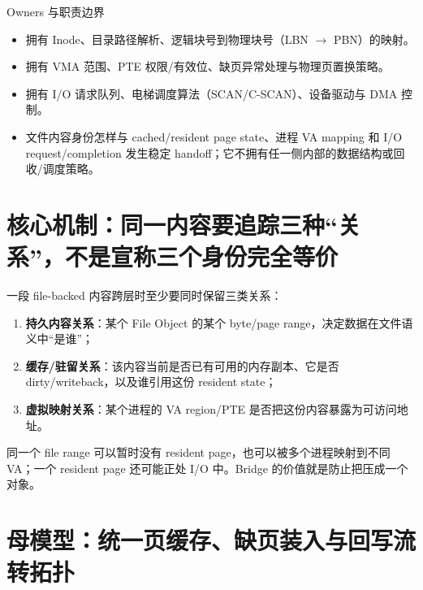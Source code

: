 \documentclass[UTF8,fontset=none,11pt,a4paper]{ctexart}
\begin{document}
\begin{methodbox}{Owners 与职责边界}
\begin{itemize}
  \item {}拥有 Inode、目录路径解析、逻辑块号到物理块号（LBN $\to$ PBN）的映射。
  \item {}拥有 VMA 范围、PTE 权限/有效位、缺页异常处理与物理页置换策略。
  \item {}拥有 I/O 请求队列、电梯调度算法（SCAN/C-SCAN）、设备驱动与 DMA 控制。
  \item {}文件内容身份怎样与 cached/resident page state、进程 VA mapping 和 I/O request/completion 发生稳定 handoff；它不拥有任一侧内部的数据结构或回收/调度策略。
\end{itemize}
\end{methodbox}

\section{核心机制：同一内容要追踪三种“关系”，不是宣称三个身份完全等价}

一段 file-backed 内容跨层时至少要同时保留三类关系：
\begin{enumerate}
  \item \textbf{持久内容关系}：某个 File Object 的某个 byte/page range，决定数据在文件语义中“是谁”；
  \item \textbf{缓存/驻留关系}：该内容当前是否已有可用的内存副本、它是否 dirty/writeback，以及谁引用这份 resident state；
  \item \textbf{虚拟映射关系}：某个进程的 VA region/PTE 是否把这份内容暴露为可访问地址。
\end{enumerate}
同一个 file range 可以暂时没有 resident page，也可以被多个进程映射到不同 VA；一个 resident page 还可能正处 I/O 中。Bridge 的价值就是防止把压成一个对象。

\section{母模型：统一页缓存、缺页装入与回写流转拓扑}
\end{document}
